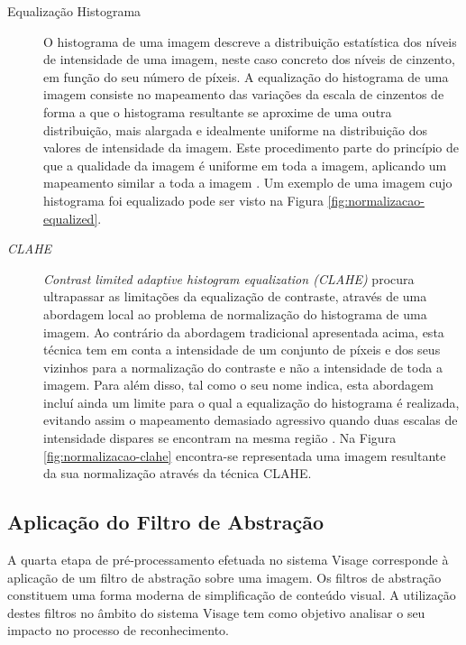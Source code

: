 \begin{description}
\item[Equalização Histograma]
O histograma de uma imagem descreve a distribuição estatística dos níveis de intensidade de uma imagem, neste caso concreto dos níveis de cinzento, em função do seu número de píxeis. A equalização do histograma de uma imagem consiste no mapeamento das variações da escala de cinzentos de forma a que o histograma resultante se aproxime de uma outra distribuição, mais alargada e idealmente uniforme na distribuição dos valores de intensidade da imagem. Este procedimento parte do princípio de que a qualidade da imagem é uniforme em toda a imagem, aplicando um mapeamento similar a toda a imagem \cite{Bradski2008}. Um exemplo de uma imagem cujo histograma foi equalizado pode ser visto na Figura \ref{fig:normalizacao-equalized}.
\end{description}

\begin{description}
\item[\textit{CLAHE}]
\textit{Contrast limited adaptive histogram equalization (CLAHE)} procura ultrapassar as limitações da equalização de contraste, através de uma abordagem local ao problema de normalização do histograma de uma imagem. Ao contrário da abordagem tradicional apresentada acima, esta técnica tem em conta a intensidade de um conjunto de píxeis e dos seus vizinhos para a normalização do contraste e não a intensidade de toda a imagem. Para além disso, tal como o seu nome indica, esta abordagem incluí ainda um limite para o qual a equalização do histograma é realizada, evitando assim o mapeamento demasiado agressivo quando duas escalas de intensidade dispares se encontram na mesma região \cite{Reza2004}. Na Figura \ref{fig:normalizacao-clahe} encontra-se representada uma imagem resultante da sua normalização através da técnica CLAHE.
\end{description}

\subsection{Aplicação do Filtro de Abstração} \label{sec:filtros}
A quarta etapa de pré-processamento efetuada no sistema Visage corresponde à aplicação de um filtro de abstração sobre uma imagem. Os filtros de abstração constituem uma forma moderna de simplificação de conteúdo visual. A utilização destes filtros no âmbito do sistema Visage tem como objetivo analisar o seu impacto no processo de reconhecimento.

